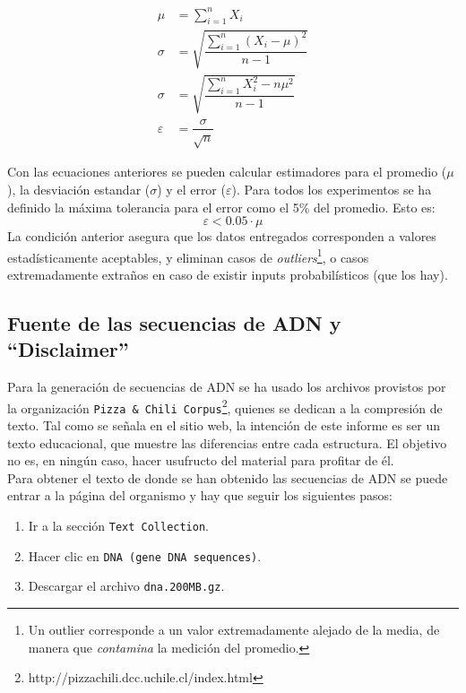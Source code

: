 \documentclass[12pt,letterpaper]{report}
\begin{document}
\begin{align}
  \mu &= \sum_{i=1}^n X_i \nonumber \\
  \sigma &= \sqrt{\dfrac{\sum_{i=1}^n (X_i - \mu)^{2}}{n-1}} \nonumber \\
  \sigma &= \sqrt{\dfrac{\sum_{i=1}^n X_i^2 - n\mu^2}{n-1}} \nonumber \\
  \varepsilon &= \dfrac{\sigma}{\sqrt{n}} \nonumber
\end{align}

Con las ecuaciones anteriores se pueden calcular estimadores para el promedio ($\mu$), la desviación estandar ($\sigma$) y el error ($\varepsilon$). Para todos los experimentos se ha definido la máxima tolerancia para el error como el 5\% del promedio. Esto es:
$$\varepsilon < 0.05\cdot \mu$$
La condición anterior asegura que los datos entregados corresponden a valores estadísticamente aceptables, y eliminan casos de \emph{outliers}\footnote{Un outlier corresponde a un valor extremadamente alejado de la media, de manera que \emph{contamina} la medición del promedio.}, o casos extremadamente extraños en caso de existir inputs probabilísticos (que los hay).

\subsection{Fuente de las secuencias de ADN y ``Disclaimer''}
\label{subsec:fuente_textos}

Para la generación de secuencias de ADN se ha usado los archivos provistos por la organización \texttt{Pizza \& Chili Corpus}\footnote{http://pizzachili.dcc.uchile.cl/index.html}, quienes se dedican a la compresión de texto. Tal como se señala en el sitio web, la intención de este informe es ser un texto educacional, que muestre las diferencias entre cada estructura. El objetivo no es, en ningún caso, hacer usufructo del material para profitar de él.\\

Para obtener el texto de donde se han obtenido las secuencias de ADN se puede entrar a la página del organismo y hay que seguir los siguientes pasos:
\begin{enumerate}
\item Ir a la sección \texttt{Text Collection}.
\item Hacer clic en \texttt{DNA (gene DNA sequences)}.
\item Descargar el archivo \texttt{dna.200MB.gz}.
\end{enumerate}
\end{document}
